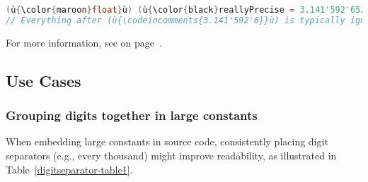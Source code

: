 \begin{lstlisting}[language=C++]
(ù{\color{maroon}float}ù) (ù{\color{black}reallyPrecise = 3.141'592'653'589'793'238'462'643'383'279'502'884;}ù)  // OK
// Everything after (ù{\codeincomments{3.141'592'6}}ù) is typically ignored silently.
\end{lstlisting}

\noindent For more information, see {\it{}} on page~\pageref{appendix:-silent-loss-of-precision-in-floating-point-literals}.

\subsection[Use Cases]{Use Cases}\label{use-cases}

\subsubsection[Grouping digits together in large constants]{Grouping digits together in large constants}\label{grouping-digits-together-in-large-constants}

When embedding large constants in source code, consistently placing
digit separators (e.g., every thousand) might improve readability, as
illustrated in Table~\ref{digitseparator-table1}.

